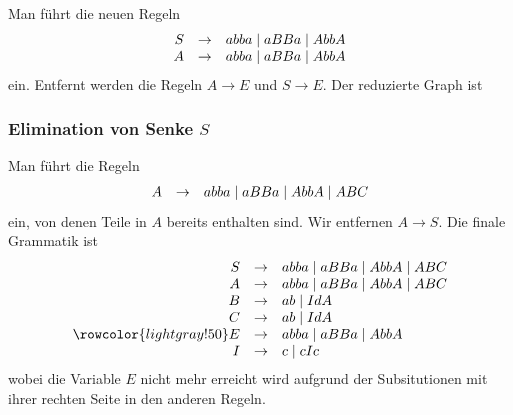 \documentclass{article}
\begin{document}
Man führt die neuen Regeln
\begin{equation*}
   \begin{array}{rcl}
      S & \rightarrow & abba \mid aBBa \mid AbbA \\
      A & \rightarrow & abba \mid aBBa \mid AbbA
   \end{array}
\end{equation*}
ein. Entfernt werden die Regeln $A \rightarrow E$ und $S \rightarrow E$. Der reduzierte Graph ist

\begin{center}
\end{center}

\subsubsection{Elimination von Senke $S$}

Man führt die Regeln
\begin{equation*}
   \begin{array}{rcl}
      A & \rightarrow & abba \mid aBBa \mid AbbA \mid ABC
   \end{array}
\end{equation*}
ein, von denen Teile in $A$ bereits enthalten sind.
Wir entfernen $A \rightarrow S$. Die finale Grammatik ist
\begin{equation*}
   \begin{array}{rcl}
      \grule{S}{abba \mid aBBa \mid AbbA \mid ABC} \\
      \grule{A}{abba \mid aBBa \mid AbbA \mid ABC} \\
      \grule{B}{ab \mid IdA} \\
      \grule{C}{ab \mid IdA} \\
      \rowcolor{lightgray!50} \grule{E}{abba \mid aBBa \mid AbbA}\\
      \grule{I}{c \mid cIc}
   \end{array}
\end{equation*}
wobei die Variable $E$ nicht mehr erreicht wird aufgrund der Subsitutionen mit
ihrer rechten Seite in den anderen Regeln.
\end{document}
